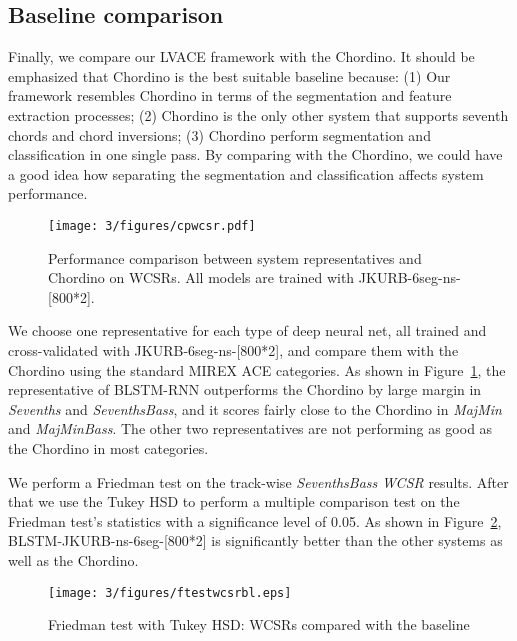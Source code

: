 \subsection{Baseline comparison} \label{sec:3-p9}
Finally, we compare our LVACE framework with the Chordino. It should be emphasized that Chordino is the best suitable baseline because: (1) Our framework resembles Chordino in terms of the segmentation and feature extraction processes; (2) Chordino is the only other system that supports seventh chords and chord inversions; (3) Chordino perform segmentation and classification in one single pass. By comparing with the Chordino, we could have a good idea how separating the segmentation and classification affects system performance.
\begin{figure}[h!]
	\centering
	\texttt{[image: 3/figures/cpwcsr.pdf]}
	\caption{Performance comparison between system representatives and Chordino on WCSRs. All models are trained with JKURB-6seg-ns-[800*2].}
	\label{fig:3-compchordino}
\end{figure}

We choose one representative for each type of deep neural net, all trained and cross-validated with JKURB-6seg-ns-[800*2], and compare them with the Chordino using the standard MIREX ACE categories. As shown in Figure~\ref{fig:3-compchordino}, the representative of BLSTM-RNN outperforms the Chordino by large margin in \textit{Sevenths} and \textit{SeventhsBass}, and it scores fairly close to the Chordino in \textit{MajMin} and \textit{MajMinBass}. The other two representatives are not performing as good as the Chordino in most categories.

We perform a Friedman test on the track-wise \textit{SeventhsBass} \textit{WCSR} results. After that we use the Tukey HSD to perform a multiple comparison test on the Friedman test's statistics with a significance level of 0.05. As shown in Figure~\ref{fig:3-friedmanwcsrbl}, BLSTM-JKURB-ns-6seg-[800*2] is significantly better than the other systems as well as the Chordino.
\begin{figure}[h!]
	\centering
	\texttt{[image: 3/figures/ftestwcsrbl.eps]}
	\caption{Friedman test with Tukey HSD: WCSRs compared with the baseline}
	\label{fig:3-friedmanwcsrbl}
\end{figure}

